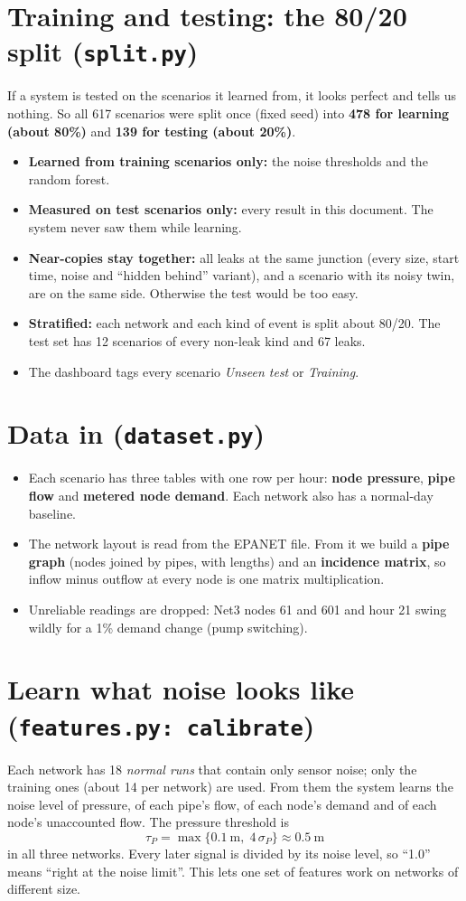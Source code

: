 \documentclass[11pt,a4paper]{article}
\newcommand{\code}[1]{\texttt{#1}}
\begin{document}
\section{Training and testing: the 80/20 split (\code{split.py})}
If a system is tested on the scenarios it learned from, it looks perfect and tells us nothing. So all 617 scenarios were split once (fixed seed) into \textbf{478 for learning (about 80\%)} and \textbf{139 for testing (about 20\%)}.
\begin{itemize}[itemsep=2pt]
\item \textbf{Learned from training scenarios only:} the noise thresholds and the random forest.
\item \textbf{Measured on test scenarios only:} every result in this document. The system never saw them while learning.
\item \textbf{Near-copies stay together:} all leaks at the same junction (every size, start time, noise and ``hidden behind'' variant), and a scenario with its noisy twin, are on the same side. Otherwise the test would be too easy.
\item \textbf{Stratified:} each network and each kind of event is split about 80/20. The test set has 12 scenarios of every non-leak kind and 67 leaks.
\item The dashboard tags every scenario \emph{Unseen test} or \emph{Training}.
\end{itemize}

\section{Data in (\code{dataset.py})}
\begin{itemize}[itemsep=2pt]
\item Each scenario has three tables with one row per hour: \textbf{node pressure}, \textbf{pipe flow} and \textbf{metered node demand}. Each network also has a normal-day baseline.
\item The network layout is read from the EPANET file. From it we build a \textbf{pipe graph} (nodes joined by pipes, with lengths) and an \textbf{incidence matrix}, so inflow minus outflow at every node is one matrix multiplication.
\item Unreliable readings are dropped: Net3 nodes 61 and 601 and hour 21 swing wildly for a 1\% demand change (pump switching).
\end{itemize}

\section{Learn what noise looks like (\code{features.py: calibrate})}
Each network has 18 \emph{normal runs} that contain only sensor noise; only the training ones (about 14 per network) are used. From them the system learns the noise level of pressure, of each pipe's flow, of each node's demand and of each node's unaccounted flow. The pressure threshold is
\[\tau_P=\max\{0.1\ \text{m},\;4\,\sigma_P\}\approx 0.5\ \text{m}\]
in all three networks. Every later signal is divided by its noise level, so ``1.0'' means ``right at the noise limit''. This lets one set of features work on networks of different size.
\end{document}
